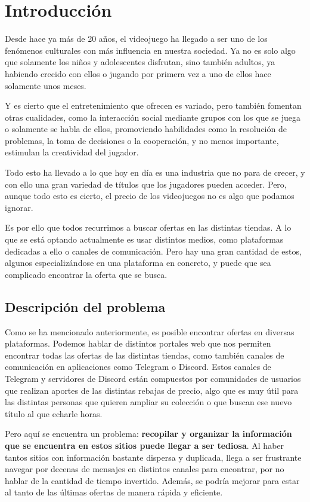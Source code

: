 \chapter{Introducción}

Desde hace ya más de 20 años, el videojuego ha llegado a ser uno de los fenómenos 
culturales con más influencia en nuestra sociedad. Ya no es solo algo que solamente 
los niños y adolescentes disfrutan, sino también adultos, ya habiendo crecido con 
ellos o jugando por primera vez a uno de ellos hace solamente unos meses.

Y es cierto que el entretenimiento que ofrecen es variado, pero también fomentan 
otras cualidades, como la interacción social mediante grupos con los que se juega o 
solamente se habla de ellos, promoviendo habilidades como la resolución de 
problemas, la toma de decisiones o la cooperación, y no menos importante, 
estimulan la creatividad del jugador.

Todo esto ha llevado a lo que hoy en día es una industria que no para de crecer, y 
con ello una gran variedad de títulos que los jugadores pueden acceder. Pero, 
aunque todo esto es cierto, el precio de los videojuegos no es algo que podamos 
ignorar.

Es por ello que todos recurrimos a buscar ofertas en las distintas tiendas. A lo 
que se está optando actualmente es usar distintos medios, como plataformas 
dedicadas a ello o canales de comunicación. Pero hay una gran cantidad de estos, 
algunos especializándose en una plataforma en concreto, y puede que sea complicado 
encontrar la oferta que se busca.

\section{Descripción del problema}

Como se ha mencionado anteriormente, es posible encontrar ofertas en diversas 
plataformas. Podemos hablar de distintos portales web que nos permiten encontrar 
todas las ofertas de las distintas tiendas, como también canales de comunicación 
en aplicaciones como Telegram o Discord. Estos canales de Telegram y servidores de 
Discord están compuestos por comunidades de usuarios que realizan aportes de las 
distintas rebajas de precio, algo que es muy útil para las distintas personas que 
quieren ampliar su colección o que buscan ese nuevo título al que echarle horas.

Pero aquí se encuentra un problema: \textbf{recopilar y organizar la información 
que se encuentra en estos sitios puede llegar a ser tediosa}. Al haber tantos 
sitios con información bastante dispersa y duplicada, llega a ser frustrante 
navegar por decenas de mensajes en distintos canales para encontrar, por no hablar 
de la cantidad de tiempo invertido. Además, se podría mejorar para estar al tanto 
de las últimas ofertas de manera rápida y eficiente.


